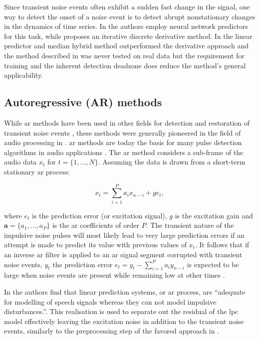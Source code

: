 Since transient noise events often exhibit a sudden fast change in the signal, one way to detect the onset of a noise event is to detect abrupt nonstationary changes in the dynamics of time series. In \cite{Fancourt2000} the authors employ neural network predictors for this task, while \cite{Kauppinen2002} proposes an iterative discrete derivative method. In \cite{Kauppinen2002} the linear predictor and median hybrid method outperformed the derivative approach and the method described in \cite{Fancourt2000} was never tested on real data but the requirement for training and the inherent detection deadzone does reduce the method's general applicability.

\subsection{Autoregressive (AR) methods}\label{sec:LitRevAR}
While \gls{ar} methods have been used in other fields for detection and restoration of transient noise events \cite{Arakawa1986}, these methods were generally pioneered in the field of audio processing in \cite{Vaseghi1988thesis}\cite{Vaseghi1988}\cite{Vaseghi1990}. \gls{ar} methods are today the basis for many pulse detection algorithms in audio applications \cite{Karjalainen1997}\cite{Esquef2000}\cite{Haermae2000}\cite{Esquef2002}\cite{Kauppinen2002}\cite{Wolfe2005}\cite{Subramanya2007}. The \gls{ar} method considers a sub-frame of the audio data $x_t$ for $ t = \{ 1, \ldots, N \}$. Assuming the data is drawn from a short-term stationary \gls{ar} process:

\begin{equation}\label{eq:ARmodel}
x_t = \sum_{i=1}^P a_i x_{n-i} + ge_t,
\end{equation}

where $e_t$ is the prediction error (or excitation signal), $g$ is the excitation gain and $\mathbf{a} = \{a_1,\ldots,a_P\}$ is the \gls{ar} coefficients of order $P$. The transient nature of the impulsive noise pulses will most likely lead to very large prediction errors if an attempt is made to predict its value with previous values of $x_t$. It follows that if an inverse \gls{ar} filter is applied to an \gls{ar} signal segment corrupted with transient noise events, $y_t$ the prediction error $e_t = y_t - \sum_{i=1}^P a_i y_{n-i}$ is expected to be large when noise events are present while remaining low at other times \cite{Godsill1998book}.

In \cite{Vaseghi1990} the authors find that linear prediction systems, or \gls{ar} process, are ``adequate for modelling of speech signals whereas they can not model impulsive disturbances.''. This realisation is used to separate out the residual of the \gls{lpc} model effectively leaving the excitation noise in addition to the transient noise events, similarly to the preprocessing step of the favored approach in \cite{Kauppinen2002}.

